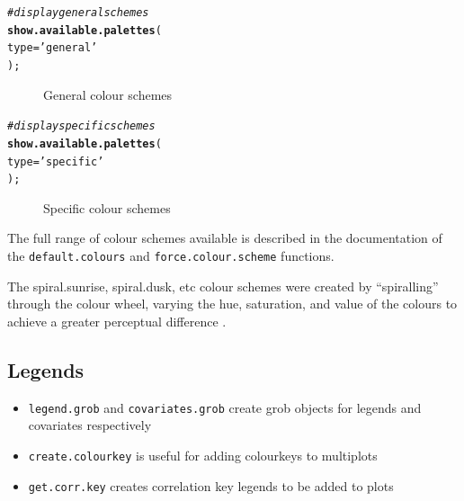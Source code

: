 \documentclass[letterpaper]{report}\usepackage[]{graphicx}\usepackage[]{color}
\makeatletter
\newcommand{\hlstr}[1]{\textcolor[rgb]{0.192,0.494,0.8}{#1}}%
\newcommand{\hlcom}[1]{\textcolor[rgb]{0.678,0.584,0.686}{\textit{#1}}}%
\newcommand{\hlstd}[1]{\textcolor[rgb]{0.345,0.345,0.345}{#1}}%
\newcommand{\hlkwc}[1]{\textcolor[rgb]{0.333,0.667,0.333}{#1}}%
\newcommand{\hlkwd}[1]{\textcolor[rgb]{0.737,0.353,0.396}{\textbf{#1}}}%
\newenvironment{kframe}{%
 \def\at@end@of@kframe{}%
 \ifinner\ifhmode%
  \def\at@end@of@kframe{\end{minipage}}%
  \begin{minipage}{\columnwidth}%
 \fi\fi%
 \def\FrameCommand##1{\hskip\@totalleftmargin \hskip-\fboxsep
 \colorbox{shadecolor}{##1}\hskip-\fboxsep
     \hskip-\linewidth \hskip-\@totalleftmargin \hskip\columnwidth}%
 \MakeFramed {\advance\hsize-\width
   \@totalleftmargin\z@ \linewidth\hsize
   \@setminipage}}%
 {\par\unskip\endMakeFramed%
 \at@end@of@kframe}
\newenvironment{knitrout}{}{} %
\makeatother
\begin{document}
\begin{knitrout}
\color{fgcolor}\begin{kframe}
\begin{alltt}
\hlcom{# display general schemes}
\hlkwd{show.available.palettes}\hlstd{(}
    \hlkwc{type} \hlstd{=} \hlstr{'general'}
    \hlstd{);}
\end{alltt}
\end{kframe}\begin{figure}

{\centering {} 

}

\caption[General colour schemes]{General colour schemes}\label{fig:colour_scheme_general}
\end{figure}


\end{knitrout}

\begin{knitrout}
\color{fgcolor}\begin{kframe}
\begin{alltt}
\hlcom{# display specific schemes}
\hlkwd{show.available.palettes}\hlstd{(}
    \hlkwc{type} \hlstd{=} \hlstr{'specific'}
    \hlstd{);}
\end{alltt}
\end{kframe}\begin{figure}

{\centering {} 

}

\caption[Specific colour schemes]{Specific colour schemes}\label{fig:colour_scheme_specific}
\end{figure}


\end{knitrout}

The full range of colour schemes available is described in the documentation of the \verb|default.colours| and \verb|force.colour.scheme| functions.

The spiral.sunrise, spiral.dusk, etc colour schemes were created by ``spiralling'' through the colour wheel, varying the hue, saturation, and value of the colours to achieve a greater perceptual difference \cite{rainbow, wong2}. 

\subsection{Legends}
\begin{itemize}
\item \texttt{legend.grob} and \texttt{covariates.grob} create grob objects for legends and covariates respectively
\item \texttt{create.colourkey} is useful for adding colourkeys to multiplots
\item \texttt{get.corr.key} creates correlation key legends to be added to plots
\end{itemize}
\end{document}
